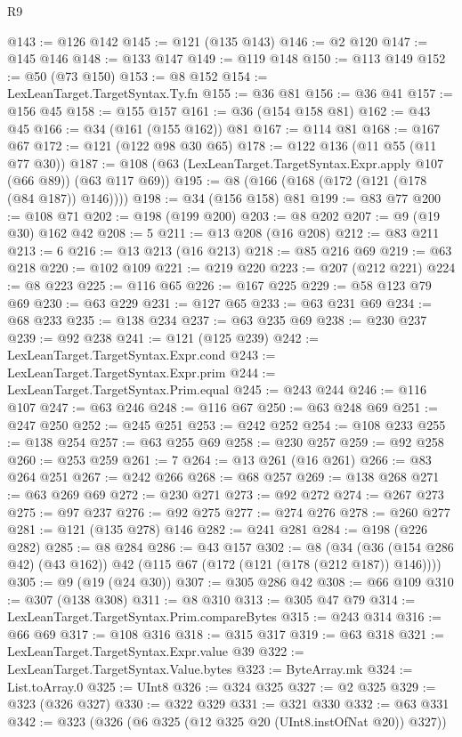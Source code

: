 \begin{lexlean}{R9}
\begin{coremodule}
@143 := @126 @142
@145 := @121 (@135 @143)
@146 := @2 @120
@147 := @145 @146
@148 := @133 @147
@149 := @119 @148
@150 := @113 @149
@152 := @50 (@73 @150)
@153 := @8 @152
@154 := LexLeanTarget.TargetSyntax.Ty.fn
@155 := @36 @81
@156 := @36 @41
@157 := @156 @45
@158 := @155 @157
@161 := @36 (@154 @158 @81)
@162 := @43 @45
@166 := @34 (@161 (@155 @162)) @81
@167 := @114 @81
@168 := @167 @67
@172 := @121 (@122 @98 @30 @65)
@178 := @122 @136 (@11 @55 (@11 @77 @30))
@187 := @108 (@63 (LexLeanTarget.TargetSyntax.Expr.apply @107 (@66 @89)) (@63 @117 @69))
@195 := @8 (@166 (@168 (@172 (@121 (@178 (@84 @187)) @146))))
@198 := @34 (@156 @158) @81
@199 := @83 @77
@200 := @108 @71
@202 := @198 (@199 @200)
@203 := @8 @202
@207 := @9 (@19 @30) @162 @42
@208 := 5
@211 := @13 @208 (@16 @208)
@212 := @83 @211
@213 := 6
@216 := @13 @213 (@16 @213)
@218 := @85 @216 @69
@219 := @63 @218
@220 := @102 @109
@221 := @219 @220
@223 := @207 (@212 @221)
@224 := @8 @223
@225 := @116 @65
@226 := @167 @225
@229 := @58 @123 @79 @69
@230 := @63 @229
@231 := @127 @65
@233 := @63 @231 @69
@234 := @68 @233
@235 := @138 @234
@237 := @63 @235 @69
@238 := @230 @237
@239 := @92 @238
@241 := @121 (@125 @239)
@242 := LexLeanTarget.TargetSyntax.Expr.cond
@243 := LexLeanTarget.TargetSyntax.Expr.prim
@244 := LexLeanTarget.TargetSyntax.Prim.equal
@245 := @243 @244
@246 := @116 @107
@247 := @63 @246
@248 := @116 @67
@250 := @63 @248 @69
@251 := @247 @250
@252 := @245 @251
@253 := @242 @252
@254 := @108 @233
@255 := @138 @254
@257 := @63 @255 @69
@258 := @230 @257
@259 := @92 @258
@260 := @253 @259
@261 := 7
@264 := @13 @261 (@16 @261)
@266 := @83 @264 @251
@267 := @242 @266
@268 := @68 @257
@269 := @138 @268
@271 := @63 @269 @69
@272 := @230 @271
@273 := @92 @272
@274 := @267 @273
@275 := @97 @237
@276 := @92 @275
@277 := @274 @276
@278 := @260 @277
@281 := @121 (@135 @278) @146
@282 := @241 @281
@284 := @198 (@226 @282)
@285 := @8 @284
@286 := @43 @157
@302 := @8
    (@34 (@36 (@154 @286 @42) (@43 @162)) @42 (@115 @67 (@172 (@121 (@178 (@212 @187)) @146))))
@305 := @9 (@19 (@24 @30))
@307 := @305 @286 @42
@308 := @66 @109
@310 := @307 (@138 @308)
@311 := @8 @310
@313 := @305 @47 @79
@314 := LexLeanTarget.TargetSyntax.Prim.compareBytes
@315 := @243 @314
@316 := @66 @69
@317 := @108 @316
@318 := @315 @317
@319 := @63 @318
@321 := LexLeanTarget.TargetSyntax.Expr.value @39
@322 := LexLeanTarget.TargetSyntax.Value.bytes
@323 := ByteArray.mk
@324 := List.toArray.{0}
@325 := UInt8
@326 := @324 @325
@327 := @2 @325
@329 := @323 (@326 @327)
@330 := @322 @329
@331 := @321 @330
@332 := @63 @331
@342 := @323 (@326 (@6 @325 (@12 @325 @20 (UInt8.instOfNat @20)) @327))

\end{coremodule}
\end{lexlean}
